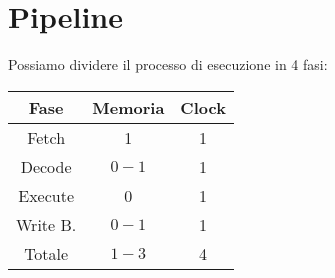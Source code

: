\documentclass[a4paper]{article}
\theoremstyle{break}
\theoremstyle{break}
\theoremstyle{break}
\theoremstyle{break}
\begin{document}
\section{Pipeline}
Possiamo dividere il processo di esecuzione in 4 fasi:
\begin{table}[H]
  \begin{center}
    \begin{tabular}{c|cc}
      \textbf{Fase} & \textbf{Memoria} & \textbf{Clock} \\
      \hline
      Fetch & 1 & 1 \\
      Decode & $0-1$ & 1 \\
      Execute & 0 & 1 \\
      Write B. & $0-1$ & 1 \\
      \hline
      Totale & $1-3$ & 4 
    \end{tabular}
  \end{center}
\end{table}
\end{document}
